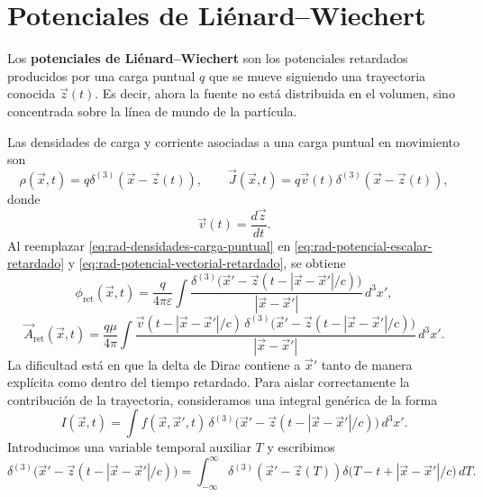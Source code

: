 \documentclass[../main.tex]{subfiles}
\begin{document}
\section{Potenciales de Liénard--Wiechert}
\label{subsec:potenciales-lienard-wiechert}

Los \textbf{potenciales de Liénard--Wiechert} son los potenciales retardados producidos por una carga puntual $q$ que se mueve siguiendo una trayectoria conocida $\vec z(t)$. Es decir, ahora la fuente no está distribuida en el volumen, sino concentrada sobre la línea de mundo de la partícula.

Las densidades de carga y corriente asociadas a una carga puntual en movimiento son
\begin{equation}
    \rho(\vec x,t)=q\delta^{(3)}(\vec x-\vec z(t)),
    \qquad
    \vec J(\vec x,t)=q\vec v(t)\delta^{(3)}(\vec x-\vec z(t)),
    \label{eq:rad-densidades-carga-puntual}
\end{equation}
donde
\begin{equation*}
    \vec v(t)=\frac{d\vec z}{dt}.
\end{equation*}
Al reemplazar \eqref{eq:rad-densidades-carga-puntual} en \eqref{eq:rad-potencial-escalar-retardado} y \eqref{eq:rad-potencial-vectorial-retardado}, se obtiene
\begin{equation}
    \phi_{\mathrm{ret}}(\vec x,t)=
    \frac{q}{4\pi\varepsilon}\int
    \frac{\delta^{(3)}\!\bigl(\vec x'-\vec z(t-|\vec x-\vec x'|/c)\bigr)}{|\vec x-\vec x'|}\,d^3x',
    \label{eq:rad-lw-phi-integral-inicial}
\end{equation}
\begin{equation}
    \vec A_{\mathrm{ret}}(\vec x,t)=
    \frac{q\mu}{4\pi}\int
    \frac{\vec v(t-|\vec x-\vec x'|/c)\,
    \delta^{(3)}\!\bigl(\vec x'-\vec z(t-|\vec x-\vec x'|/c)\bigr)}{|\vec x-\vec x'|}\,d^3x'.
    \label{eq:rad-lw-A-integral-inicial}
\end{equation}
La dificultad está en que la delta de Dirac contiene a $\vec x'$ tanto de manera explícita como dentro del tiempo retardado. Para aislar correctamente la contribución de la trayectoria, consideramos una integral genérica de la forma
\begin{equation}
    I(\vec x,t)=\int
    f(\vec x,\vec x',t)\,
    \delta^{(3)}\!\bigl(\vec x'-\vec z(t-|\vec x-\vec x'|/c)\bigr)\,d^3x'.
    \label{eq:rad-lw-integral-generica}
\end{equation}
Introducimos una variable temporal auxiliar $T$ y escribimos
\begin{equation}
    \delta^{(3)}\!\bigl(\vec x'-\vec z(t-|\vec x-\vec x'|/c)\bigr)
    =\int_{-\infty}^{\infty}
    \delta^{(3)}(\vec x'-\vec z(T))
    \delta\!\bigl(T-t+|\vec x-\vec x'|/c\bigr)\,dT.
    \label{eq:rad-lw-delta-auxiliar}
\end{equation}
\end{document}
